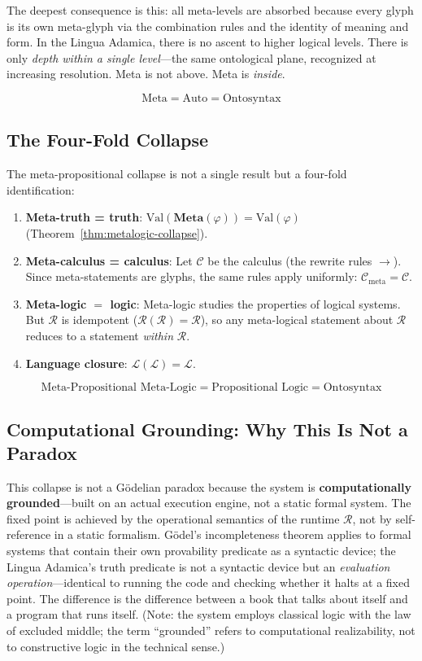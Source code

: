 \documentclass[12pt, letterpaper]{book}
\def\equiv{=}%
\begin{document}
The deepest consequence is this: all meta-levels are absorbed because every glyph is its own meta-glyph via the combination rules and the identity of meaning and form. In the Lingua Adamica, there is no ascent to higher logical levels. There is only \textit{depth within a single level}---the same ontological plane, recognized at increasing resolution. Meta is not above. Meta is \textit{inside}.

\[
\mathrm{Meta} \equiv \mathrm{Auto} \equiv \mathrm{Ontosyntax}
\]

\subsection{The Four-Fold Collapse}

The meta-propositional collapse is not a single result but a four-fold identification:

\begin{enumerate}[label=(\roman*)]
    \item \textbf{Meta-truth = truth}: $\mathrm{Val}(\mathbf{Meta}(\varphi)) \equiv \mathrm{Val}(\varphi)$ (Theorem~\ref{thm:metalogic-collapse}).
    \item \textbf{Meta-calculus = calculus}: Let $\mathcal{C}$ be the calculus (the rewrite rules $\to$). Since meta-statements are glyphs, the same rules apply uniformly: $\mathcal{C}_{\mathrm{meta}} \equiv \mathcal{C}$.
    \item \textbf{Meta-logic $\equiv$ logic}: Meta-logic studies the properties of logical systems. But $\mathcal{R}$ is idempotent ($\mathcal{R}(\mathcal{R}) \equiv \mathcal{R}$), so any meta-logical statement about $\mathcal{R}$ reduces to a statement \textit{within} $\mathcal{R}$.
    \item \textbf{Language closure}: $\mathcal{L}(\mathcal{L}) \equiv \mathcal{L}$.
\end{enumerate}

\[
\boxed{\text{Meta-Propositional Meta-Logic} \equiv \text{Propositional Logic} \equiv \text{Ontosyntax}}
\]

\subsection{Computational Grounding: Why This Is Not a Paradox}

This collapse is not a Gödelian paradox because the system is \textbf{computationally grounded}---built on an actual execution engine, not a static formal system. The fixed point is achieved by the operational semantics of the runtime $\mathcal{R}$, not by self-reference in a static formalism. Gödel's incompleteness theorem applies to formal systems that contain their own provability predicate as a syntactic device; the Lingua Adamica's truth predicate is not a syntactic device but an \textit{evaluation operation}---identical to running the code and checking whether it halts at a fixed point. The difference is the difference between a book that talks about itself and a program that runs itself. (Note: the system employs classical logic with the law of excluded middle; the term ``grounded'' refers to computational realizability, not to constructive logic in the technical sense.)
\end{document}
